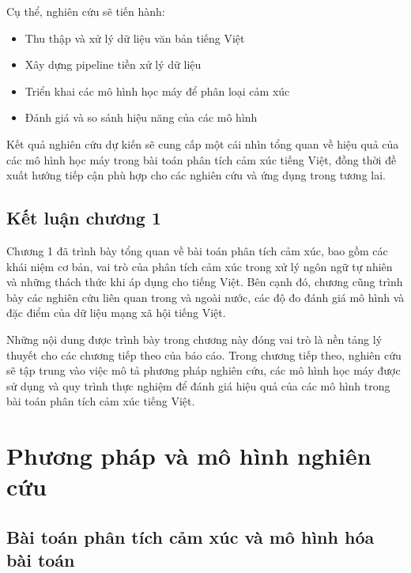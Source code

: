 \documentclass[14pt, a4paper]{report}
\begin{document}
Cụ thể, nghiên cứu sẽ tiến hành:

\begin{itemize}
    \item Thu thập và xử lý dữ liệu văn bản tiếng Việt
    \item Xây dựng pipeline tiền xử lý dữ liệu
    \item Triển khai các mô hình học máy để phân loại cảm xúc
    \item Đánh giá và so sánh hiệu năng của các mô hình
\end{itemize}

Kết quả nghiên cứu dự kiến sẽ cung cấp một cái nhìn tổng quan về hiệu quả của các mô hình học máy trong bài toán phân tích cảm xúc tiếng Việt, đồng thời đề xuất hướng tiếp cận phù hợp cho các nghiên cứu và ứng dụng trong tương lai.

\section{Kết luận chương 1}

Chương 1 đã trình bày tổng quan về bài toán phân tích cảm xúc, bao gồm các khái niệm cơ bản, vai trò của phân tích cảm xúc trong xử lý ngôn ngữ tự nhiên và những thách thức khi áp dụng cho tiếng Việt. Bên cạnh đó, chương cũng trình bày các nghiên cứu liên quan trong và ngoài nước, các độ đo đánh giá mô hình và đặc điểm của dữ liệu mạng xã hội tiếng Việt.

Những nội dung được trình bày trong chương này đóng vai trò là nền tảng lý thuyết cho các chương tiếp theo của báo cáo. Trong chương tiếp theo, nghiên cứu sẽ tập trung vào việc mô tả phương pháp nghiên cứu, các mô hình học máy được sử dụng và quy trình thực nghiệm để đánh giá hiệu quả của các mô hình trong bài toán phân tích cảm xúc tiếng Việt.

\newpage

\chapter{Phương pháp và mô hình nghiên cứu}
\label{chap:chapter2}

\section{Bài toán phân tích cảm xúc và mô hình hóa bài toán}
\end{document}
